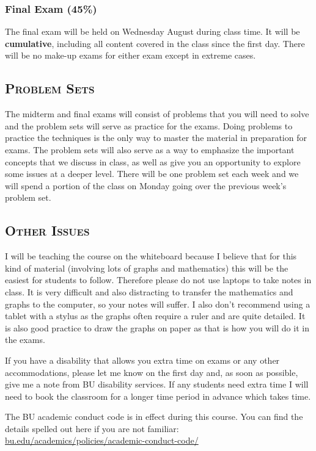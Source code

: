 \documentclass[10pt]{article}
\begin{document}
\subsubsection*{Final Exam (45\%)}
The final exam will be held on Wednesday August  during class time. It will be \textbf{cumulative}, including all content covered in the class since the first day. There will be no make-up exams for either exam except in extreme cases.

\subsection*{\textsc{Problem Sets}}
The midterm and final exams will consist of problems that you will need to solve and the problem sets will serve as practice for the exams. Doing problems to practice the techniques is the only way to master the material in preparation for exams. The problem sets will also serve as a way to emphasize the important concepts that we discuss in class, as well as give you an opportunity to explore some issues at a deeper level. There will be one problem set each week and we will spend a portion of the class on Monday going over the previous week's problem set.

\subsection*{\textsc{Other Issues}}
I will be teaching the course on the whiteboard because I believe that for this kind of material (involving lots of graphs and mathematics) this will be the easiest for students to follow. Therefore please do not use laptops to take notes in class.  It is very difficult and also distracting to transfer the mathematics and graphs to the computer, so your notes will suffer. I also don't recommend using a tablet with a stylus as the graphs often require a ruler and are quite detailed. It is also good practice to draw the graphs on paper as that is how you will do it in the exams.

If you have a disability that allows you extra time on exams or any other accommodations, please let me know on the first day and, as soon as possible, give me a note from BU disability services. If any students need extra time I will need to book the classroom for a longer time period in advance which takes time.

The BU academic conduct code is in effect during this course. You can
find the details spelled out here if you are not familiar:
\href{http://www.bu.edu/academics/policies/academic-conduct-code/}
{bu.edu/academics/policies/academic-conduct-code/}
\end{document}

